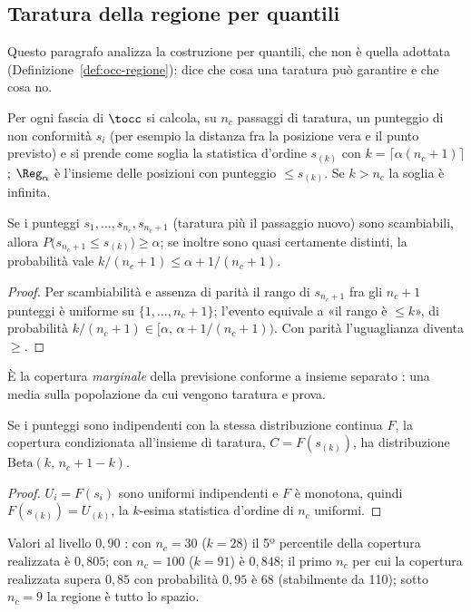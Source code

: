 \subsection{Taratura della regione per quantili}\label{sec:val-taratura}

Questo paragrafo analizza la costruzione per quantili, che non è quella adottata (Definizione~\ref{def:occ-regione}): dice che cosa una taratura può garantire e che cosa no.

Per ogni fascia di $\tocc$ si calcola, su $n_c$ passaggi di taratura, un punteggio di non conformità $s_i$ (per esempio la distanza fra la posizione vera e il punto previsto) e si prende come soglia la statistica d'ordine $s_{(k)}$ con $k=\lceil\alpha(n_c+1)\rceil$; $\Reg_\alpha$ è l'insieme delle posizioni con punteggio $\le s_{(k)}$. Se $k>n_c$ la soglia è infinita.

\begin{proposizione}\label{prop:val-marginale}
Se i punteggi $s_1,\dots,s_{n_c},s_{n_c+1}$ (taratura più il passaggio nuovo) sono scambiabili, allora $P\bigl(s_{n_c+1}\le s_{(k)}\bigr)\ge\alpha$; se inoltre sono quasi certamente distinti, la probabilità vale $k/(n_c+1)\le\alpha+1/(n_c+1)$. 
\end{proposizione}
\begin{proof}
Per scambiabilità e assenza di parità il rango di $s_{n_c+1}$ fra gli $n_c+1$ punteggi è uniforme su $\{1,\dots,n_c+1\}$; l'evento equivale a «il rango è $\le k$», di probabilità $k/(n_c+1)\in[\alpha,\,\alpha+1/(n_c+1))$. Con parità l'uguaglianza diventa $\ge$.
\end{proof}
È la copertura \emph{marginale} della previsione conforme a insieme separato \cite{angelopoulos2021}: una media sulla popolazione da cui vengono taratura e prova.

\begin{proposizione}\label{prop:val-beta}
Se i punteggi sono indipendenti con la stessa distribuzione continua $F$, la copertura condizionata all'insieme di taratura, $C=F(s_{(k)})$, ha distribuzione $\mathrm{Beta}(k,\,n_c+1-k)$. 
\end{proposizione}
\begin{proof}
$U_i=F(s_i)$ sono uniformi indipendenti e $F$ è monotona, quindi $F(s_{(k)})=U_{(k)}$, la $k$-esima statistica d'ordine di $n_c$ uniformi.
\end{proof}
Valori al livello $0{,}90$ : con $n_c=30$ ($k=28$) il 5º percentile della copertura realizzata è $0{,}805$; con $n_c=100$ ($k=91$) è $0{,}848$; il primo $n_c$ per cui la copertura realizzata supera $0{,}85$ con probabilità $0{,}95$ è 68 (stabilmente da 110); sotto $n_c=9$ la regione è tutto lo spazio.

